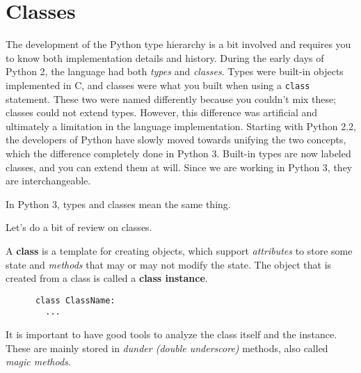 \section{Classes} 

  The development of the Python type hierarchy is a bit involved and requires you to know both implementation details and history. During the early days of Python 2, the language had both \textit{types} and \textit{classes}. Types were built-in objects implemented in C, and classes were what you built when using a \texttt{class} statement. These two were named differently because you couldn't mix these; classes could not extend types. However, this difference was artificial and ultimately a limitation in the language implementation. Starting with Python 2.2, the developers of Python have slowly moved towards unifying the two concepts, which the difference completely done in Python 3. Built-in types are now labeled classes, and you can extend them at will. Since we are working in Python 3, they are interchangeable.  

  \begin{theorem}
    In Python 3, types and classes mean the same thing. 
  \end{theorem} 

  Let's do a bit of review on classes. 

  \begin{definition}[Class] 
    A \textbf{class} is a template for creating objects, which support \textit{attributes} to store some state and \textit{methods} that may or may not modify the state. The object that is created from a class is called a \textbf{class instance}. 

    \begin{lstlisting}
      class ClassName: 
        ...  
    \end{lstlisting}
  \end{definition} 

  It is important to have good tools to analyze the class itself and the instance. These are mainly stored in \textit{dunder (double underscore)} methods, also called \textit{magic methods}. 

